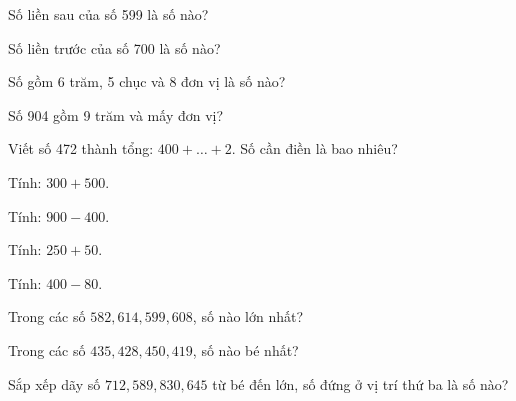 \begin{ex}
Số liền sau của số 599 là số nào?
\end{ex}

\begin{ex}
Số liền trước của số 700 là số nào?
\end{ex}

\begin{ex}
Số gồm 6 trăm, 5 chục và 8 đơn vị là số nào?
\end{ex}

\begin{ex}
Số 904 gồm 9 trăm và mấy đơn vị?
\end{ex}

\begin{ex}
Viết số 472 thành tổng: $400 + \dots + 2$. Số cần điền là bao nhiêu?
\end{ex}

\begin{ex}
Tính: $300 + 500$.
\end{ex}

\begin{ex}
Tính: $900 - 400$.
\end{ex}

\begin{ex}
Tính: $250 + 50$.
\end{ex}

\begin{ex}
Tính: $400 - 80$.
\end{ex}

\begin{ex}
Trong các số $582, 614, 599, 608$, số nào lớn nhất?
\end{ex}

\begin{ex}
Trong các số $435, 428, 450, 419$, số nào bé nhất?
\end{ex}

\begin{ex}
Sắp xếp dãy số $712, 589, 830, 645$ từ bé đến lớn, số đứng ở vị trí thứ ba là số nào?
\end{ex}

